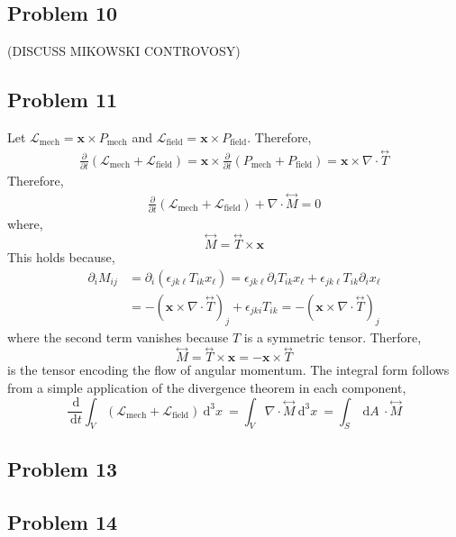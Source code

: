 \documentclass[12pt]{extarticle}
\renewcommand{\d}[1]{\: \mathrm{d}#1}
\newcommand{\dn}[2]{\: \mathrm{d}^{#1} #2 \:}
\newcommand{\deriv}[2]{\frac{\d{#1}}{\d{#2}}}
\newcommand{\pderiv}[2]{\frac{\partial{#1}}{\partial{#2}}}
\renewcommand{\bf}[1]{\mathbf{#1}}
\theoremstyle{definition}
\begin{document}
\subsection{Problem 10}
(DISCUSS MIKOWSKI CONTROVOSY)

\subsection{Problem 11}

\newcommand{\dyad}[1]{\stackrel{\leftrightarrow}{#1}}

Let $\mathcal{L}_{\text{mech}} = \bf{x} \times P_{\text{mech}}$ and $\mathcal{L}_{\text{field}} = \bf{x} \times P_{\text{field}}$. Therefore,
\begin{align*}
\pderiv{}{t} \left( \mathcal{L}_{\text{mech}} + \mathcal{L}_{\text{field}} \right) = \bf{x} \times \pderiv{}{t} \left( P_{\text{mech}} + P_{\text{field}} \right) = \bf{x} \times \nabla \cdot \stackrel{\leftrightarrow}{T}
\end{align*}
Therefore,
\begin{align*}
\pderiv{}{t} \left( \mathcal{L}_{\text{mech}} + \mathcal{L}_{\text{field}} \right) + \nabla \cdot \dyad{M} = 0
\end{align*}
where,
\[ \stackrel{\leftrightarrow}{M} = \dyad{T} \times \bf{x} \]
This holds because,
\begin{align*}
\partial_i M_{ij} & = \partial_i (\epsilon_{jk\ell} T_{ik} x_{\ell}) = \epsilon_{jk \ell} \partial_i T_{ik} x_{\ell} +  \epsilon_{jk \ell} T_{ik} \partial_i x_{\ell} 
\\
& = - (\bf{x} \times \nabla \cdot \dyad{T})_j + \epsilon_{j k i} T_{ik} = - (\bf{x} \times \nabla \cdot \dyad{T})_j
\end{align*}
where the second term vanishes because $T$ is a symmetric tensor. Therfore,
\[ \dyad{M} = \dyad{T} \times \bf{x} = - \bf{x} \times \dyad{T} \]
is the tensor encoding the flow of angular momentum. The integral form follows from a simple application of the divergence theorem in each component,
\[ \deriv{}{t}  \int_V \left( \mathcal{L}_{\text{mech}} + \mathcal{L}_{\text{field}} \right) \dn{3}{x} = \int_V \nabla \cdot \dyad{M} \dn{3}{x} = \int_S \d{A} \: \cdot \dyad{M} \]

\subsection{Problem 13}

\subsection{Problem 14}
\end{document}
